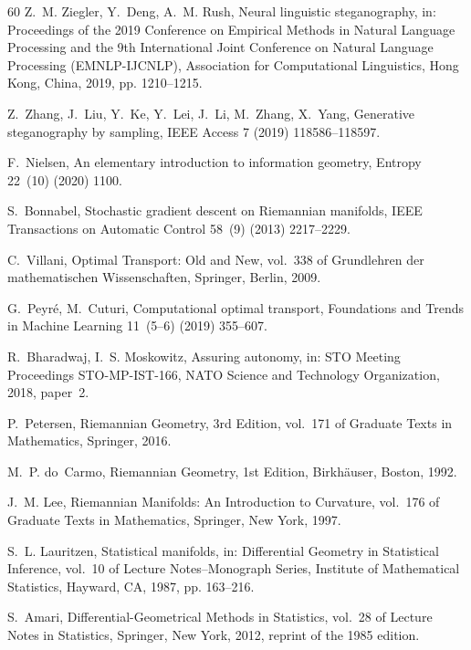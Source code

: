 \documentclass[a4paper,fleqn]{cas-dc}
\begin{document}
\begin{thebibliography}{60}
Z.~M. Ziegler, Y.~Deng, A.~M. Rush, Neural linguistic steganography, in: Proceedings of the 2019 Conference on Empirical Methods in Natural Language Processing and the 9th International Joint Conference on Natural Language Processing (EMNLP-IJCNLP), Association for Computational Linguistics, Hong Kong, China, 2019, pp. 1210--1215.

Z.~Zhang, J.~Liu, Y.~Ke, Y.~Lei, J.~Li, M.~Zhang, X.~Yang, Generative steganography by sampling, IEEE Access 7 (2019) 118586--118597.

F.~Nielsen, An elementary introduction to information geometry, Entropy 22~(10) (2020) 1100.

S.~Bonnabel, Stochastic gradient descent on Riemannian manifolds, IEEE Transactions on Automatic Control 58~(9) (2013) 2217--2229.

C.~Villani, Optimal Transport: Old and New, vol.~338 of Grundlehren der mathematischen Wissenschaften, Springer, Berlin, 2009.

G.~Peyr\'e, M.~Cuturi, Computational optimal transport, Foundations and Trends in Machine Learning 11~(5--6) (2019) 355--607.

R.~Bharadwaj, I.~S. Moskowitz, Assuring autonomy, in: STO Meeting Proceedings STO-MP-IST-166, NATO Science and Technology Organization, 2018, paper~2.

P.~Petersen, Riemannian Geometry, 3rd Edition, vol.~171 of Graduate Texts in Mathematics, Springer, 2016.

M.~P. do~Carmo, Riemannian Geometry, 1st Edition, Birkh{\"a}user, Boston, 1992.

J.~M. Lee, Riemannian Manifolds: An Introduction to Curvature, vol.~176 of Graduate Texts in Mathematics, Springer, New York, 1997.

S.~L. Lauritzen, Statistical manifolds, in: Differential Geometry in Statistical Inference, vol.~10 of Lecture Notes--Monograph Series, Institute of Mathematical Statistics, Hayward, CA, 1987, pp. 163--216.

S.~Amari, Differential-Geometrical Methods in Statistics, vol.~28 of Lecture Notes in Statistics, Springer, New York, 2012, reprint of the 1985 edition.


\end{thebibliography}
\end{document}
